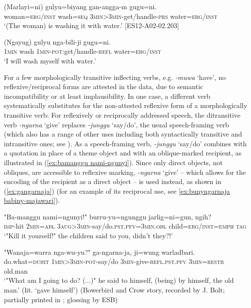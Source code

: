 \documentclass[output=paper,colorlinks,citecolor=brown]{langscibook}
\begin{document}
\ea
\gll ({Marlayi=ni}) {gulyu=biyang} {gan-angga-m} {gugu=ni}. \\
woman\textsc{=erg/inst} wash\textsc{=seq} \textsc{3min>3min}-get/handle-\textsc{prs} water\textsc{=erg/inst} \\
\glt `(The woman) is washing it with water.' [ES12-A02-02.203]
\label{ex:gulyu gananggam}
\z

\ea
\gll ({Ngayug}) {gulyu} {nga-bili-ji} {gugu=ni}. \\
\textsc{1min} wash \textsc{1min-pot:}get/handle-\textsc{refl} water=\textsc{erg/inst} \\
\glt `I will wash myself with water.' \citep[53]{Bolt1971}
\label{ex:gulyu ngabiliji}
\z

For a few morphologically transitive inflecting verbs, e.g. \textit{-muwa} `have', no reflexive/reciprocal forms are attested in the data, due to semantic incompatibility or at least implausibility. In one case, a different verb systematically substitutes for the non-attested reflexive form of a morphologically transitive verb: For reflexively or reciprocally addressed speech, the ditransitive verb \textit{-ngarna} `give' replaces \textit{-junggu} `say/do', the usual speech-framing verb (which also has a range of other uses including both syntactically transitive and intransitive ones; see \citealt{SchultzeBerndt2008}). As a speech-framing verb, \textit{-junggu} `say/do' combines with a quotation in place of a theme object and with an oblique-marked recipient, as illustrated in (\ref{ex:bamanggu nami-ngunyi}). Since only direct objects, not obliques, are accessible to reflexive marking, \textit{-ngarna} `give' – which allows for the encoding of the recipient as a direct object – is used instead, as shown in (\ref{ex:gangarnaja}) (for an example of its reciprocal use, see \ref{ex:bunyngarnaja babiny-majawari}).

\ea
\gll "{Ba-manggu} {nami=ngunyi}!" {burru-yu=ngunggu} {jarlig=ni=gun}, {ngih}? \\
\textsc{imp}-hit \textsc{2min=abl} \textsc{3aug>3min-}say/do.\textsc{pst.pfv=3min.obl} child=\textsc{erg/inst=emph} \textsc{tag} \\
\glt `"Kill it yourself!" the children said to you, didn't they?!'
\label{ex:bamanggu nami-ngunyi}
\z

\ea
\gll "{Wanaja=warra} {nga-wu-yu?}" {ga-ngarna-ja}, {ji=wung} {warladbari}. \\
do.what\textsc{=dubit} \textsc{1min>3min-pot}-say/do \textsc{3min}-give-\textsc{refl.pst.pfv} \textsc{3min=restr} old.man \\
\glt `"What am I going to do? (...)" he said to himself, (being) by himself, the old man.' (lit. `gave himself') (Bowerbird and Crow story, recorded by J. Bolt; partially printed in \citealt[130--134]{Bolt1971}; glossing by ESB)
\label{ex:gangarnaja}
\z
\end{document}
